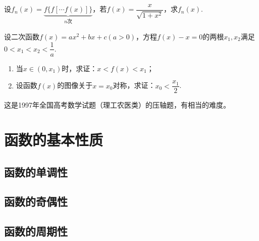 \documentclass[lang=cn,math=cm,chinesefont=nofont,11pt,scheme=chinese,onecol]{elegantbook}
\begin{document}
\begin{exercise}
  设$f_n(x)=\underbrace{f\{f[\cdots f(x)]\}}_{n\text{次}}$，若$f(x)=\dfrac{x}{\sqrt{1+x^2}}$，求$f_n(x)$.
\end{exercise}

\begin{exercise}
  设二次函数$f(x)=ax^{2}+bx+c(a>0)$，方程$f(x)-x=0$的两根$x_1,x_2$满足$0<x_1<x_2<\dfrac1a$.
\end{exercise}

\begin{enumerate}
  \item 当$x\in(0,x_1)$时，求证：$x<f(x)<x_1$；
  \item 设函数$f(x)$的图像关于$x=x_0$对称，求证：$x_0<\dfrac{x_1}{2}$.
\end{enumerate}

\begin{remark}
  这是1997年全国高考数学试题（理工农医类）的压轴题，有相当的难度。
\end{remark}

\section{函数的基本性质}

\subsection{函数的单调性}

\subsection{函数的奇偶性}

\subsection{函数的周期性}
\end{document}
